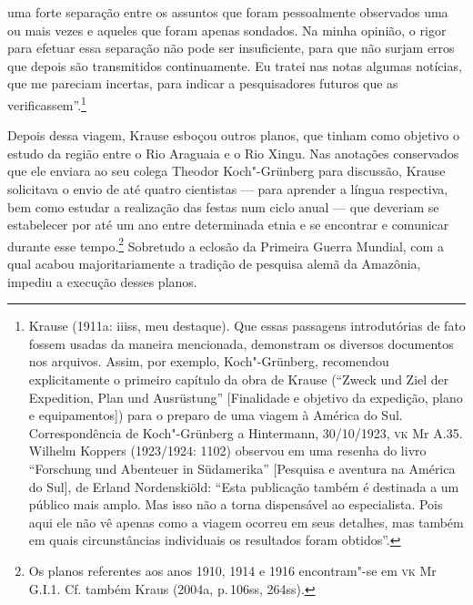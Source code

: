 uma forte separação entre os assuntos que foram pessoalmente observados
uma ou mais vezes e aqueles que foram apenas sondados. Na minha opinião,
o rigor para efetuar essa separação não pode ser insuficiente, para que
não surjam erros que depois são transmitidos continuamente. Eu tratei
nas notas algumas notícias, que me pareciam incertas, para indicar a
pesquisadores futuros que as verificassem''.\footnote{Krause (1911a:
  iiiss, meu destaque). Que essas passagens introdutórias de fato fossem
  usadas da maneira mencionada, demonstram os diversos documentos nos
  arquivos. Assim, por exemplo, Koch"-Grünberg, recomendou
  explicitamente o primeiro capítulo da obra de Krause (``Zweck und Ziel
  der Expedition, Plan und Ausrüstung'' {[}Finalidade e objetivo da
  expedição, plano e equipamentos{]}) para o preparo de uma viagem à
  América do Sul. Correspondência de Koch"-Grünberg a Hintermann,
  30/10/1923, \textsc{vk} Mr A.35. Wilhelm Koppers (1923/1924: 1102) observou em
  uma resenha do livro ``Forschung und Abenteuer in Südamerika''
  {[}Pesquisa e aventura na América do Sul{]}, de Erland Nordenskiöld:
  ``Esta publicação também é destinada a um público mais amplo. Mas isso
  não a torna dispensável ao especialista. Pois aqui ele não vê apenas
  como a viagem ocorreu em seus detalhes, mas também em quais
  circunstâncias individuais os resultados foram obtidos''.}

Depois dessa viagem, Krause esboçou outros planos, que tinham como
objetivo o estudo da região entre o Rio Araguaia e o Rio Xingu. Nas
anotações conservados que ele enviara ao seu colega Theodor
Koch"-Grünberg para discussão, Krause solicitava o envio de até quatro
cientistas --- para aprender a língua respectiva, bem como estudar a
realização das festas num ciclo anual --- que deveriam se estabelecer por
até um ano entre determinada etnia e se encontrar e comunicar durante
esse tempo.\footnote{Os planos referentes aos anos 1910, 1914 e 1916
  encontram"-se em \textsc{vk} Mr G.I.1. Cf. também Kraus (2004a, p.\,106ss,
  264ss).} Sobretudo a eclosão da Primeira Guerra Mundial, com a qual
acabou majoritariamente a tradição de pesquisa alemã da Amazônia,
impediu a execução desses planos.

